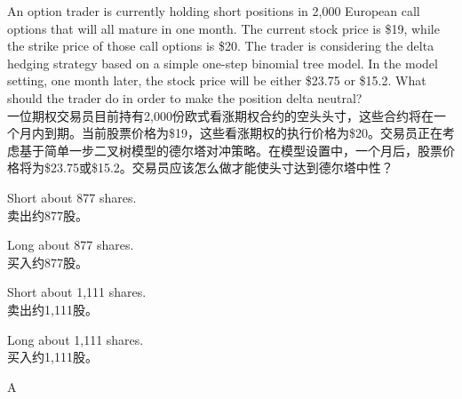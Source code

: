 \documentclass{article}
\newcounter{question} %
\begin{document}
\begin{question}
    An option trader is currently holding short positions in 2,000 European call options that will all mature in one month. The current stock price is \$19, while the strike price of those call options is \$20. The trader is considering the delta hedging strategy based on a simple one-step binomial tree model. In the model setting, one month later, the stock price will be either \$23.75 or \$15.2. What should the trader do in order to make the position delta neutral?\\
    一位期权交易员目前持有2,000份欧式看涨期权合约的空头头寸，这些合约将在一个月内到期。当前股票价格为\$19，这些看涨期权的执行价格为\$20。交易员正在考虑基于简单一步二叉树模型的德尔塔对冲策略。在模型设置中，一个月后，股票价格将为\$23.75或\$15.2。交易员应该怎么做才能使头寸达到德尔塔中性？
\end{question}

\begin{choices}
    \item Short about 877 shares. \\
    卖出约877股。
    \item Long about 877 shares. \\
    买入约877股。
    \item Short about 1,111 shares. \\
    卖出约1,111股。
    \item Long about 1,111 shares.\\
    买入约1,111股。
\end{choices}

\begin{correctanswer}
    A
\end{correctanswer}
\end{document}
